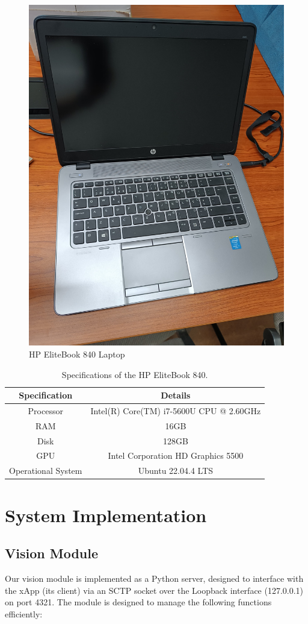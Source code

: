\begin{figure}[H]
    \centering
    \includegraphics[width=0.3\linewidth]{figures/hp}
    \caption{HP EliteBook 840 Laptop}
    \label{fig:computer_hp}
\end{figure}

\begin{table}[H]
    \caption{Specifications of the HP EliteBook 840.}
    \label{tab:specs_pc_ue}
    \begin{tabular}{|c|c|}
        \hline
        \textbf{Specification} & \textbf{Details} \\ \hline
        Processor                      &  Intel(R) Core(TM) i7-5600U CPU @ 2.60GHz          \\ \hline
        RAM                      &          16GB        \\ \hline
        Disk                      &   128GB         \\ \hline
        GPU                     &   Intel Corporation HD Graphics 5500                \\ \hline
        Operational System & Ubuntu 22.04.4 LTS                  \\ \hline  %
    \end{tabular}
\end{table}

\section{System Implementation}\label{sec:impl}

\subsection{Vision Module}\label{subsec:vision-module}
Our vision module is implemented as a Python server, designed to interface with the xApp (its client) via an SCTP socket over the Loopback interface (127.0.0.1) on port 4321.
The module is designed to manage the following functions efficiently:

